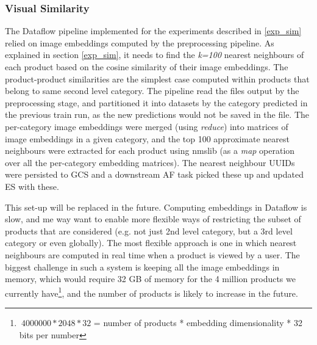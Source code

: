 \subsubsection{Visual Similarity}
\label{vis_sim_pp}

The Dataflow pipeline implemented for the experiments described in \ref{exp_sim} relied on image embeddings computed by the preprocessing pipeline.
As explained in section \ref{exp_sim}, it needs to find the \textit{k=100} nearest neighbours of each product based on the cosine similarity of their image embeddings.
The product-product  similarities are the simplest case computed within products that belong to same second level category.
The pipeline read the files output by the preprocessing stage, and partitioned it into datasets by the category predicted in the previous train run, as the new predictions would not be saved in the file.
The per-category image embeddings were merged (using \textit{reduce}) into matrices of image embeddings in a given category, and the top 100 approximate nearest neighbours were extracted for each product using nmslib \cite{nmslib} (as a \textit{map} operation over all the per-category embedding matrices).
The nearest neighbour UUIDs were persisted to GCS and a downstream AF task picked these up and updated ES with these.

This set-up will be replaced in the future.
Computing embeddings in Dataflow is slow, and me way want to enable more flexible ways of restricting the subset of products that are considered (e.g. not just 2nd level category, but a 3rd level category or even globally).
The most flexible approach is one in which nearest neighbours are computed in real time when a product is viewed by a user.
The biggest challenge in such a system is keeping all the image embeddings in memory, which would require 32 GB of memory for the 4 million products we currently have\footnote{$~4000000 * 2048 * 32$ = number of products * embedding dimensionality * 32 bits per number}, and the number of products is likely to increase in the future.

